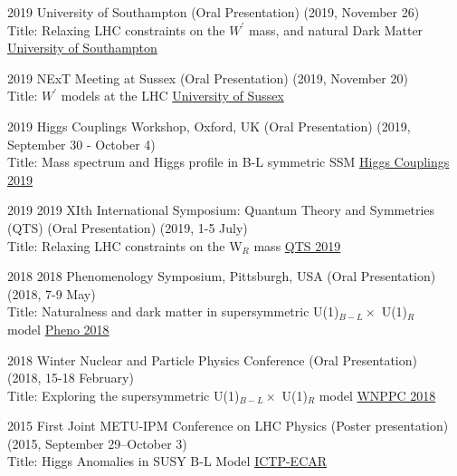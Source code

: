 \documentclass[]{friggeri-cv}
\begin{document}
\begin{entrylist}
	
	\entry
	{2019}
	{University of Southampton \normalfont (Oral Presentation) (2019, November 26) \\
		Title: Relaxing LHC constraints on the $W^\prime$ mass, and natural Dark Matter }
	{\href{https://www.hep.phys.soton.ac.uk/content/Tuesday-2019-11-26-Ozer-Ozdal}{University of Southampton}} 	
	
	\entry
	{2019}
	{NExT Meeting at Sussex \normalfont (Oral Presentation) (2019, November 20) \\
	Title: $W^\prime$ models at the LHC}
	{\href{https://indico.cern.ch/event/857401/overview}{University of Sussex}} 		
	
	
	\entry
	{2019}
	{Higgs Couplings Workshop, Oxford, UK \normalfont (Oral Presentation) (2019, September 30 - October 4) \\
		Title: Mass spectrum and Higgs profile in B-L symmetric SSM}
	{\href{https://indico.cern.ch/event/796574/contributions/3521711/}{Higgs Couplings 2019}} 	
	
	
	\entry
	{2019}
	{2019 XIth International Symposium: Quantum Theory and Symmetries (QTS)  \normalfont (Oral Presentation) (2019, 1-5 July) \\
		Title: Relaxing LHC constraints on the W$_R$ mass}
	{\href{http://www.crm.umontreal.ca/2019/QTS2019/pdf/ozdal.pdf}{QTS 2019}} 
	
	\entry
	{2018}
	{2018 Phenomenology Symposium, Pittsburgh, USA  \normalfont (Oral Presentation) \\ (2018, 7-9 May) \\
		Title: Naturalness and dark matter in supersymmetric U(1)$_{B-L} \times$ U(1)$_R$ \\ model}
	{\href{https://indico.cern.ch/event/699148/}{Pheno 2018}} 
	
	\entry
	{2018}
	{Winter Nuclear and Particle Physics Conference  \normalfont (Oral Presentation) \\ (2018, 15-18 February) \\
		Title: Exploring the supersymmetric U(1)$_{B-L} \times$ U(1)$_R$ model}
	{\href{http://wnppc.triumf.ca/2018/}{WNPPC 2018}}
	
	\entry
	{2015}
	{First Joint METU-IPM Conference on LHC Physics  \normalfont (Poster presentation) \\ (2015, September 29--October 3) \\
		Title: Higgs Anomalies in SUSY B-L Model}
	{\href{http://ictp-ecar.org/events/first-joint-metu-ipm-conference-on-lhc-physics/}{ICTP-ECAR}}
	

\end{entrylist}
\end{document}
